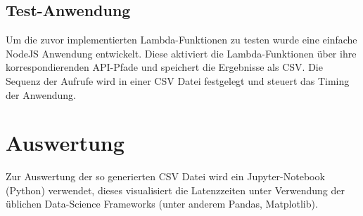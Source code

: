\documentclass[12pt,a4paper,parskip=half]{scrreprt}
\begin{document}
\subsection{Test-Anwendung}

Um die zuvor implementierten Lambda-Funktionen zu testen wurde eine einfache NodeJS Anwendung entwickelt. Diese aktiviert die Lambda-Funktionen über ihre korrespondierenden API-Pfade und speichert die Ergebnisse als CSV. Die Sequenz der Aufrufe wird in einer CSV Datei festgelegt und steuert das Timing der Anwendung.

\section{Auswertung}

Zur Auswertung der so generierten CSV Datei wird ein Jupyter-Notebook (Python) verwendet, dieses visualisiert die Latenzzeiten unter Verwendung der üblichen Data-Science Frameworks (unter anderem Pandas, Matplotlib).




\newpage

\nocite{*}
\thispagestyle{headings}


 
\end{document}
